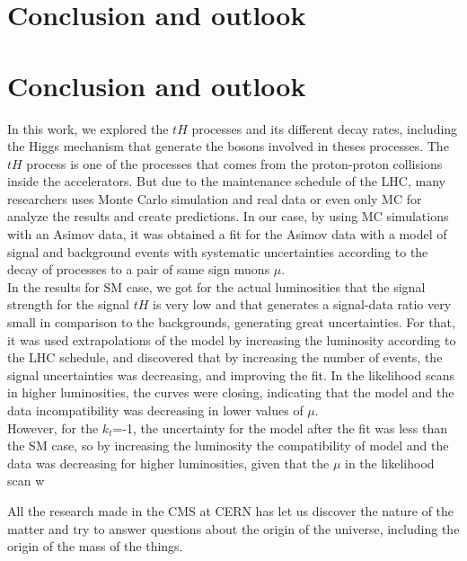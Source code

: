 \chapter{Conclusion and outlook}

\chapter{Conclusion and outlook}
In this work, we explored the $tH$ processes and its different decay rates, including the Higgs mechanism that generate the bosons involved in theses processes. 
The $tH$ process is one of the processes that comes from the proton-proton collisions inside the accelerators. But due to the maintenance schedule of the LHC, many researchers uses Monte Carlo simulation and real data or even only MC for analyze the results and create predictions. In our case, by using MC simulations with an Asimov data, it was obtained a fit for the Asimov data with a model of signal and background events with systematic uncertainties according to the decay of processes to a pair of same sign muons $\mu$. \\

In the results for SM case, we got for the actual luminosities that the signal strength for the signal $tH$ is very low and that generates a signal-data ratio very small in comparison to the backgrounds, generating great uncertainties. For that, it was used extrapolations of the model by increasing the luminosity according to the LHC schedule, and discovered that by increasing the number of events, the signal uncertainties was decreasing, and improving the fit. In the likelihood scans in higher luminosities, the curves were closing, indicating that the model and the data incompatibility was decreasing in lower values of $\mu$. 
\\

However, for the $k_t$=-1, the uncertainty for the model after the fit was less than the SM case, so by increasing the luminosity the compatibility of model and the data was decreasing for higher luminosities, given that the $\mu$ in the likelihood scan w


All the research made in the CMS at CERN has let us discover the nature of the matter and try to answer questions about the origin of the universe, including the origin of the mass of the things. \\


